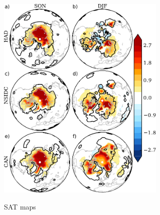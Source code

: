 \documentclass[twocol]{ametsoc}
\begin{document}
\begin{figure}[t]
  \noindent\includegraphics[width=19pc,angle=0]{SATmaps.pdf}\\
  \caption{SAT maps
}\label{fig:fig3}
\end{figure}
\end{document}
